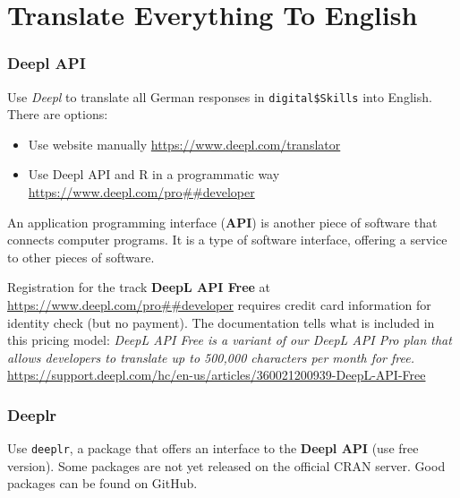 \documentclass[
]{book}
\providecommand{\tightlist}{%
  \setlength{\itemsep}{0pt}\setlength{\parskip}{0pt}}
\begin{document}
\hypertarget{section-1}{%
\subsubsection*{}\label{section-1}}

\hypertarget{translate-everything-to-english}{%
\section{Translate Everything To English}\label{translate-everything-to-english}}

\hypertarget{deepl-api}{%
\subsubsection{Deepl API}\label{deepl-api}}

Use \emph{Deepl} to translate all German responses in \texttt{digital\$Skills} into English. There are options:

\begin{itemize}
\tightlist
\item
  Use website manually \url{https://www.deepl.com/translator}
\item
  Use Deepl API and R in a programmatic way \url{https://www.deepl.com/pro\#\#developer}
\end{itemize}

An application programming interface (\textbf{API}) is another piece of software that connects computer programs. It is a type of software interface, offering a service to other pieces of software.

Registration for the track \textbf{DeepL API Free} at \url{https://www.deepl.com/pro\#\#developer} requires credit card information for identity check (but no payment). The documentation tells what is included in this pricing model: \emph{DeepL API Free is a variant of our DeepL API Pro plan that allows developers to translate up to 500,000 characters per month for free.} \url{https://support.deepl.com/hc/en-us/articles/360021200939-DeepL-API-Free}

\hypertarget{deeplr}{%
\subsubsection{Deeplr}\label{deeplr}}

Use \texttt{deeplr}, a package that offers an interface to the \textbf{Deepl API} (use free version). Some packages are not yet released on the official CRAN server. Good packages can be found on GitHub.
\end{document}
